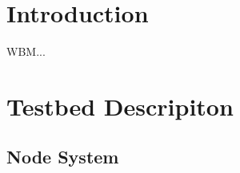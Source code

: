 \documentclass[a4paper,12pt,twoside]{article}
\begin{document}
\section{Introduction}
\label{sec:introduction}


WBM...









\section{Testbed Descripiton}

\subsection{Node System}
\end{document}
